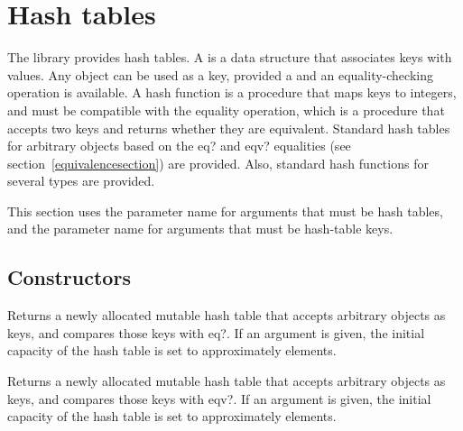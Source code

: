 \chapter{Hash tables}
\label{hashtablechapter}

The  library provides hash tables.
A  is a data structure that associates keys with values.
Any object can be used as a key, provided a 
and an equality-checking operation is available.  A hash function is a
procedure that maps
keys to integers, and must be compatible with the equality operation,
which is a procedure that accepts two keys and returns whether they
are equivalent.
Standard hash tables for arbitrary objects based on the {\cf eq?} and 
{\cf eqv?} equalities (see section~\ref{equivalencesection}) are provided.  
Also, standard hash functions for several types are provided.

This section uses the  parameter name for arguments
that must be hash tables, and the  parameter name for
arguments that must be hash-table keys.

\section{Constructors}


\begin{entry}{%
}

Returns a newly allocated mutable hash table that accepts
arbitrary objects as keys,
and compares those keys with {\cf eq?}. If an argument is given, the initial 
capacity of the hash table is set to approximately  elements.

\end{entry}

\begin{entry}{%
}

Returns a newly allocated mutable hash table that accepts
arbitrary objects as keys,
and compares those keys with {\cf eqv?}.
If an argument is given, the initial 
capacity of the hash table is set to approximately  elements.

\end{entry}

